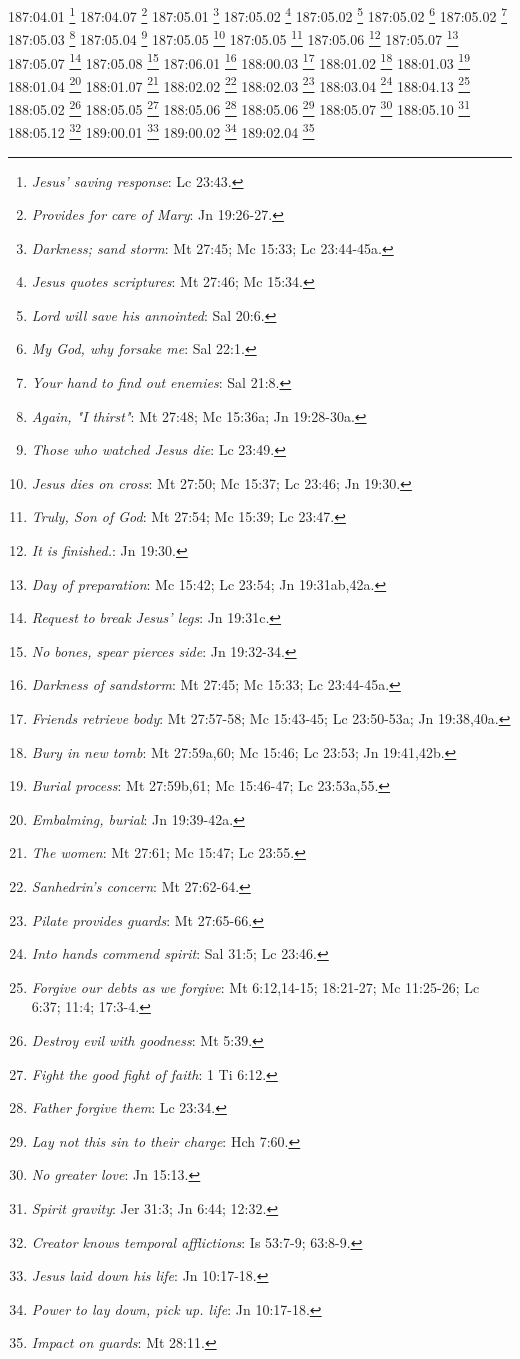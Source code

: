 187:04.01 \footnote{\textit{Jesus' saving response}: Lc 23:43.}
187:04.07 \footnote{\textit{Provides for care of Mary}: Jn 19:26-27.}
187:05.01 \footnote{\textit{Darkness; sand storm}: Mt 27:45; Mc 15:33; Lc 23:44-45a.}
187:05.02 \footnote{\textit{Jesus quotes scriptures}: Mt 27:46; Mc 15:34.}
187:05.02 \footnote{\textit{Lord will save his annointed}: Sal 20:6.}
187:05.02 \footnote{\textit{My God, why forsake me}: Sal 22:1.}
187:05.02 \footnote{\textit{Your hand to find out enemies}: Sal 21:8.}
187:05.03 \footnote{\textit{Again, "I thirst"}: Mt 27:48; Mc 15:36a; Jn 19:28-30a.}
187:05.04 \footnote{\textit{Those who watched Jesus die}: Lc 23:49.}
187:05.05 \footnote{\textit{Jesus dies on cross}: Mt 27:50; Mc 15:37; Lc 23:46; Jn 19:30.}
187:05.05 \footnote{\textit{Truly, Son of God}: Mt 27:54; Mc 15:39; Lc 23:47.}
187:05.06 \footnote{\textit{It is finished.}: Jn 19:30.}
187:05.07 \footnote{\textit{Day of preparation}: Mc 15:42; Lc 23:54; Jn 19:31ab,42a.}
187:05.07 \footnote{\textit{Request to break Jesus' legs}: Jn 19:31c.}
187:05.08 \footnote{\textit{No bones, spear pierces side}: Jn 19:32-34.}
187:06.01 \footnote{\textit{Darkness of sandstorm}: Mt 27:45; Mc 15:33; Lc 23:44-45a.}
188:00.03 \footnote{\textit{Friends retrieve body}: Mt 27:57-58; Mc 15:43-45; Lc 23:50-53a; Jn 19:38,40a.}
188:01.02 \footnote{\textit{Bury in new tomb}: Mt 27:59a,60; Mc 15:46; Lc 23:53; Jn 19:41,42b.}
188:01.03 \footnote{\textit{Burial process}: Mt 27:59b,61; Mc 15:46-47; Lc 23:53a,55.}
188:01.04 \footnote{\textit{Embalming, burial}: Jn 19:39-42a.}
188:01.07 \footnote{\textit{The women}: Mt 27:61; Mc 15:47; Lc 23:55.}
188:02.02 \footnote{\textit{Sanhedrin's concern}: Mt 27:62-64.}
188:02.03 \footnote{\textit{Pilate provides guards}: Mt 27:65-66.}
188:03.04 \footnote{\textit{Into hands commend spirit}: Sal 31:5; Lc 23:46.}
188:04.13 \footnote{\textit{Forgive our debts as we forgive}: Mt 6:12,14-15; 18:21-27; Mc 11:25-26; Lc 6:37; 11:4; 17:3-4.}
188:05.02 \footnote{\textit{Destroy evil with goodness}: Mt 5:39.}
188:05.05 \footnote{\textit{Fight the good fight of faith}: 1 Ti 6:12.}
188:05.06 \footnote{\textit{Father forgive them}: Lc 23:34.}
188:05.06 \footnote{\textit{Lay not this sin to their charge}: Hch 7:60.}
188:05.07 \footnote{\textit{No greater love}: Jn 15:13.}
188:05.10 \footnote{\textit{Spirit gravity}: Jer 31:3; Jn 6:44; 12:32.}
188:05.12 \footnote{\textit{Creator knows temporal afflictions}: Is 53:7-9; 63:8-9.}
189:00.01 \footnote{\textit{Jesus laid down his life}: Jn 10:17-18.}
189:00.02 \footnote{\textit{Power to lay down, pick up. life}: Jn 10:17-18.}
189:02.04 \footnote{\textit{Impact on guards}: Mt 28:11.}
